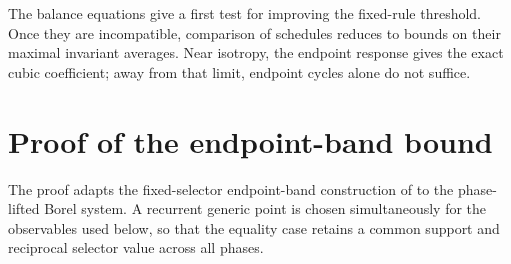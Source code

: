 \documentclass[letterpaper,twoside]{article}
\begin{document}
The balance equations give a first test for improving the fixed-rule
threshold.  Once they are incompatible, comparison of schedules reduces to
bounds on their maximal invariant averages. Near isotropy, the endpoint response gives the exact cubic coefficient; away from that limit, endpoint cycles alone do not suffice.

\clearpage
\section{Proof of the endpoint-band bound}\label{sec:endpoint-band-proof}

The proof adapts the fixed-selector endpoint-band construction of
\cite{YangYuan2026} to the phase-lifted Borel system.  A recurrent generic
point is chosen simultaneously for the observables used below, so that the
equality case retains a common support and reciprocal selector value across
all phases.
\end{document}
